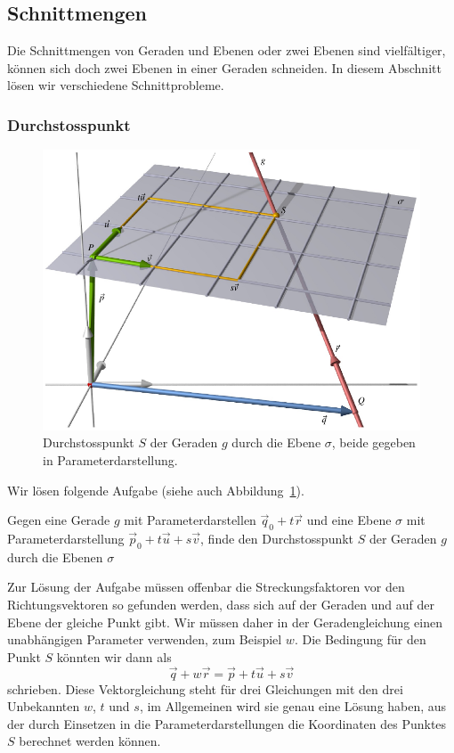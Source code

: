 \subsection{Schnittmengen}
Die Schnittmengen von Geraden und Ebenen oder zwei Ebenen sind 
vielfältiger, können sich doch zwei Ebenen in einer Geraden
schneiden.
In diesem Abschnitt lösen wir verschiedene Schnittprobleme.

\subsubsection{Durchstosspunkt}
\begin{figure}
\centering
\includegraphics{3/images/durchstosspunkt.pdf}
\caption{Durchstosspunkt $S$ der Geraden $g$ durch die Ebene $\sigma$,
beide gegeben in Parameterdarstellung.
\label{skript:affin:durchstosspunkt}}
\end{figure}
Wir lösen folgende Aufgabe (siehe auch
Abbildung~\ref{skript:affin:durchstosspunkt}).

\begin{aufgabe}
Gegen eine Gerade $g$ mit Parameterdarstellen
$\vec{q}_0+t\vec{r}$
und eine Ebene $\sigma$ mit Parameterdarstellung
$\vec{p}_0+t\vec{u}+s\vec{v}$,
finde den Durchstosspunkt $S$ der Geraden $g$ durch die Ebenen $\sigma$
\end{aufgabe}

Zur Lösung der Aufgabe müssen offenbar die Streckungsfaktoren vor den
Richtungsvektoren so gefunden werden, dass sich auf der Geraden und
auf der Ebene der gleiche Punkt gibt.
Wir müssen daher in der Geradengleichung einen unabhängigen Parameter
verwenden, zum Beispiel $w$.
Die Bedingung für den Punkt $S$ könnten wir dann als
\[
\vec{q} + w\vec{r} = \vec{p} + t\vec{u} + s\vec{v}
\]
schrieben.
Diese Vektorgleichung steht für drei Gleichungen mit den drei Unbekannten
$w$, $t$ und $s$, im Allgemeinen wird sie genau eine Lösung haben,
aus der durch Einsetzen in die Parameterdarstellungen die Koordinaten
des Punktes $S$ berechnet werden können.

